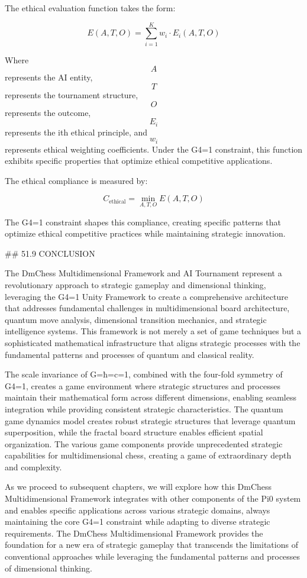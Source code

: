 The ethical evaluation function takes the form:

$$ E(A, T, O) = \sum_{i=1}^{K} w_i \cdot E_i(A, T, O) $$

Where $$ A $$ represents the AI entity, $$ T $$ represents the tournament structure, $$ O $$ represents the outcome, $$ E_i $$ represents the ith ethical principle, and $$ w_i $$ represents ethical weighting coefficients. Under the G4=1 constraint, this function exhibits specific properties that optimize ethical competitive applications.

The ethical compliance is measured by:

$$ C_{\text{ethical}} = \min_{A, T, O} E(A, T, O) $$

The G4=1 constraint shapes this compliance, creating specific patterns that optimize ethical competitive practices while maintaining strategic innovation.

## 51.9 CONCLUSION

The DmChess Multidimensional Framework and AI Tournament represent a revolutionary approach to strategic gameplay and dimensional thinking, leveraging the G4=1 Unity Framework to create a comprehensive architecture that addresses fundamental challenges in multidimensional board architecture, quantum move analysis, dimensional transition mechanics, and strategic intelligence systems. This framework is not merely a set of game techniques but a sophisticated mathematical infrastructure that aligns strategic processes with the fundamental patterns and processes of quantum and classical reality.

The scale invariance of G=ħ=c=1, combined with the four-fold symmetry of G4=1, creates a game environment where strategic structures and processes maintain their mathematical form across different dimensions, enabling seamless integration while providing consistent strategic characteristics. The quantum game dynamics model creates robust strategic structures that leverage quantum superposition, while the fractal board structure enables efficient spatial organization. The various game components provide unprecedented strategic capabilities for multidimensional chess, creating a game of extraordinary depth and complexity.

As we proceed to subsequent chapters, we will explore how this DmChess Multidimensional Framework integrates with other components of the Pi0 system and enables specific applications across various strategic domains, always maintaining the core G4=1 constraint while adapting to diverse strategic requirements. The DmChess Multidimensional Framework provides the foundation for a new era of strategic gameplay that transcends the limitations of conventional approaches while leveraging the fundamental patterns and processes of dimensional thinking.

